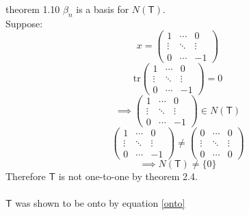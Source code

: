 \begin{enumerate}[(a)]
theorem 1.10 $\beta_n$ is a basis for $N(\mathsf{T})$.
\\Suppose: \[x =\begin{pmatrix}
1&\cdots&0\\
 \vdots&\ddots&\vdots\\
0&\cdots&-1
\end{pmatrix} \]
\begin{equation}
\text{tr}\begin{pmatrix}
1&\cdots&0\\
 \vdots&\ddots&\vdots\\
0&\cdots&-1
\end{pmatrix}=0
\end{equation}
\begin{equation}
\implies \begin{pmatrix}
1&\cdots&0\\
 \vdots&\ddots&\vdots\\
0&\cdots&-1
\end{pmatrix} \in N(\mathsf{T})
\end{equation}
\begin{equation}
\begin{pmatrix}
1&\cdots&0\\
 \vdots&\ddots&\vdots\\
0&\cdots&-1
\end{pmatrix} \neq 
\begin{pmatrix}
0&\cdots&0\\
 \vdots&\ddots&\vdots\\
0&\cdots&0
\end{pmatrix}
\end{equation}
\begin{equation}
\implies N(\mathsf{T}) \neq \{0\}
\end{equation}
Therefore $\mathsf{T}$ is not one-to-one by theorem 2.4.
\paragraph{}
$\mathsf{T}$ was shown to be onto by equation \ref{onto}
\end{enumerate}
